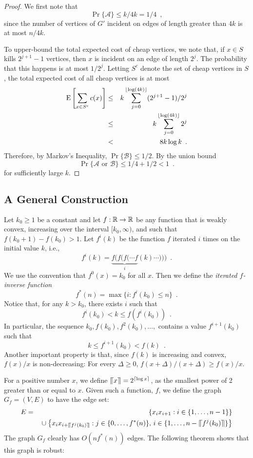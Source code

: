 \documentclass{patmorin}
\begin{document}
\begin{proof}
  We first note that 
  \[
     \Pr\{\mathcal{A}\} \le k/4k = 1/4 \enspace ,
  \]
  since the number of vertices of $G'$ incident on edges of length
  greater than $4k$ is at most $n/4k$.

  To upper-bound the total expected cost of cheap vertices, we note that,
  if $x\in S$ kills $2^{j+1}-1$ vertices, then $x$ is incident on an
  edge of length $2^{j}$.  The probability that this happens is at most
  $1/2^{j}$.  Letting $S^{c}$ denote the set of cheap vertices in $S$,
  the total expected cost of all cheap vertices is at most
  \begin{eqnarray*}
     \mathrm{E}\left[\sum_{x\in S^{c}}c(x) \right] 
    &\le&  k\sum_{j=0}^{{\lfloor \log (4k) \rfloor}} (2^{j+1}-1)/2^j \\
     &\le& k\sum_{j=0}^{{\lfloor \log (4k) \rfloor}} 2^j \\
     &<& 8k\log k \enspace .
  \end{eqnarray*}
  Therefore, by Markov's Inequality, $\Pr\{\mathcal{B}\}\le 1/2$.
  By the union bound
  \[
     \Pr\{\mbox{$\mathcal{A}$ or $\mathcal{B}$}\} \le 1/4+ 1/2 < 1
  \enspace .
  \]
  for sufficiently large $k$.
\end{proof}

\subsection{A General Construction}

Let $k_0\ge 1$ be a constant and let $f:\mathbb{R}\rightarrow\mathbb{R}$ be any function
that is weakly convex, increasing over the interval $[k_0,\infty)$,
and such that $f(k_0+1)-f(k_0) > 1$.  Let $f^{i}(k)$ be the function $f$
iterated $i$ times on the initial value $k$, i.e.,
\[
   f^{i}(k) = \underbrace{f(f(f(\cdots f}_{i}(k)\cdots))) \enspace .
\]
We use the convention that $f^0(x) = k_0$ for all $x$.
Then we define the \emph{iterated
$f$-inverse function}
\[
   f^*(n) = \max\{i : f^{i}(k_0) \le n\} \enspace .
\] 
Notice that, for any $k> k_0$, there exists $i$ such that
\[
   f^i(k_0) < k \le f(f^i(k_0)) \enspace .
\]
In particular, the sequence $k_0,f(k_0),f^2(k_0),\ldots,$ contains
a value $f^{i+1}(k_0)$ such that
\[
      k  \le  f^{i+1}(k_0) < f(k) \enspace .
\]
Another important property is that, since $f(k)$ is increasing
and convex, $f(x)/x$ is non-decreasing: For every $\Delta\ge 0$,
$f(x+\Delta)/(x+\Delta) \ge f(x)/x$.

\newcommand{\upen}[1]{\llceil#1\rrceil}

For a positive number $x$, we define $\upen{x}=2^{\ceil{\log x}}$, as the
smallest power of 2 greater than or equal to $x$.  Given such a function,
$f$, we define the graph $G_f=(V,E)$ to have the edge set:
\begin{eqnarray*}
    E &=& \quad\left\{ x_ix_{i+1} : i\in\{1,\ldots,n-1\} \right\} \\
     && {} \cup \left\{ x_{i}x_{i+\upen{f^j(k_0)}} : j\in\{0,\ldots,f^*(n)\},\,
        i\in\{1,\ldots,n-\upen{f^j(k_0)}\} \right\}
\end{eqnarray*}
The graph $G_f$ clearly has $O(nf^*(n))$ edges.  The following theorem shows that this graph is robust:
\end{document}
